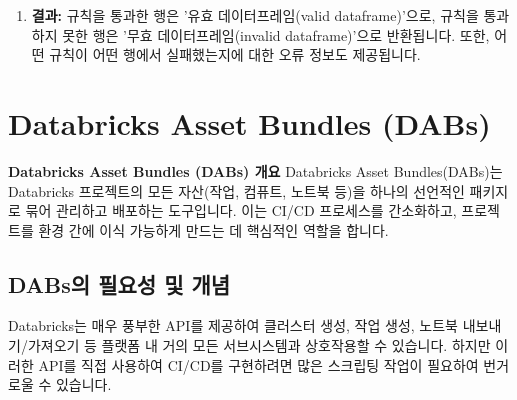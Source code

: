 \documentclass[11pt,a4paper]{article}
\begin{document}
\begin{enumerate}
\begin{lstlisting}[language=Python, caption={DQX 엔진 적용 예시}, label={lst:dqx_engine_apply}]
# YAML 규칙 로드 (예시: rules.yaml 파일에서 로드)
yaml_rules = """
rules:
  - id: id_not_null_not_empty
    column: ID
    expectation: not_null_not_empty
    criticality: ERROR
  - id: age_range
    column: Age
    expectation: between(18, 120)
    criticality: ERROR
  - id: country_in_list
    column: Country
    expectation: in_list(['Germany', 'France'])
    criticality: WARNING
  - id: id_unique
    column: ID
    expectation: is_unique
    criticality: ERROR
"""
# 실제 코드에서는 yaml.safe_load(file_content) 사용

dq_engine = DQEngine(spark_session=spark, rules=yaml_rules)
result = dq_engine.run(df)

valid_df = result.get_valid_dataframe()
invalid_df = result.get_invalid_dataframe()
errors = result.get_errors()

print("Valid Data:")
valid_df.show()
print("Invalid Data:")
invalid_df.show()
print("Detected Errors:")
for error in errors:
    print(error)
\end{lstlisting}
    \item \textbf{결과:}
    규칙을 통과한 행은 '유효 데이터프레임(valid dataframe)'으로, 규칙을 통과하지 못한 행은 '무효 데이터프레임(invalid dataframe)'으로 반환됩니다. 또한, 어떤 규칙이 어떤 행에서 실패했는지에 대한 오류 정보도 제공됩니다.
\end{enumerate}

\newpage
\section{Databricks Asset Bundles (DABs)}

\begin{conceptbox}
\textbf{Databricks Asset Bundles (DABs) 개요}
Databricks Asset Bundles(DABs)는 Databricks 프로젝트의 모든 자산(작업, 컴퓨트, 노트북 등)을 하나의 선언적인 패키지로 묶어 관리하고 배포하는 도구입니다. 이는 CI/CD 프로세스를 간소화하고, 프로젝트를 환경 간에 이식 가능하게 만드는 데 핵심적인 역할을 합니다.
\end{conceptbox}

\subsection{DABs의 필요성 및 개념}
Databricks는 매우 풍부한 API를 제공하여 클러스터 생성, 작업 생성, 노트북 내보내기/가져오기 등 플랫폼 내 거의 모든 서브시스템과 상호작용할 수 있습니다. 하지만 이러한 API를 직접 사용하여 CI/CD를 구현하려면 많은 스크립팅 작업이 필요하여 번거로울 수 있습니다.
\end{document}
